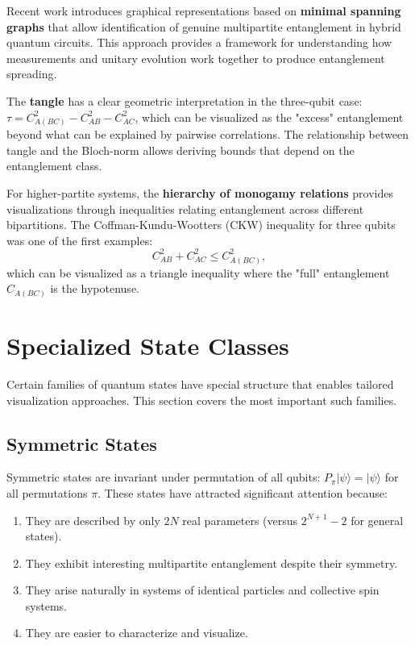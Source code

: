 \documentclass[12pt,a4paper]{article}
\begin{document}
Recent work \cite{SpanningGraphs2025} introduces graphical representations based on \textbf{minimal spanning graphs} that allow identification of genuine multipartite entanglement in hybrid quantum circuits. This approach provides a framework for understanding how measurements and unitary evolution work together to produce entanglement spreading.

The \textbf{tangle} has a clear geometric interpretation in the three-qubit case: $\tau = C_{A(BC)}^2 - C_{AB}^2 - C_{AC}^2$, which can be visualized as the "excess" entanglement beyond what can be explained by pairwise correlations. The relationship between tangle and the Bloch-norm allows deriving bounds that depend on the entanglement class.

For higher-partite systems, the \textbf{hierarchy of monogamy relations} provides visualizations through inequalities relating entanglement across different bipartitions. The Coffman-Kundu-Wootters (CKW) inequality for three qubits was one of the first examples:
\begin{equation}
	C_{AB}^2 + C_{AC}^2 \leq C_{A(BC)}^2,
\end{equation}
which can be visualized as a triangle inequality where the "full" entanglement $C_{A(BC)}$ is the hypotenuse.

\section{Specialized State Classes}
\label{sec:specialized}

Certain families of quantum states have special structure that enables tailored visualization approaches. This section covers the most important such families.

\subsection{Symmetric States}
\label{sec:symmetric}

Symmetric states are invariant under permutation of all qubits: $P_\pi |\psi\rangle = |\psi\rangle$ for all permutations $\pi$. These states have attracted significant attention because:
\begin{enumerate}
	\item They are described by only $2N$ real parameters (versus $2^{N+1} - 2$ for general states).
	\item They exhibit interesting multipartite entanglement despite their symmetry.
	\item They arise naturally in systems of identical particles and collective spin systems.
	\item They are easier to characterize and visualize.
\end{enumerate}
\end{document}
